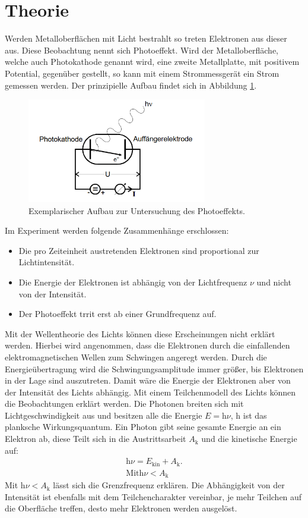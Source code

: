 \section{Theorie}
\label{sec:Theorie}
Werden Metalloberflächen mit Licht bestrahlt so treten Elektronen aus dieser aus.
Diese Beobachtung nennt sich Photoeffekt. Wird der Metalloberfläche, welche auch Photokathode genannt wird,
eine zweite Metallplatte, mit positivem Potential, gegenüber gestellt, so kann mit einem Strommessgerät ein
Strom gemessen werden. Der prinzipielle Aufbau findet sich in Abbildung \ref{fig:aufbau}.
\begin{figure}
 \centering
 \includegraphics[width=0.7\textwidth]{aufbau.png}
 \caption{Exemplarischer Aufbau zur Untersuchung des Photoeffekts.\cite{sample}}
 \label{fig:aufbau}
\end{figure}
Im Experiment werden folgende Zusammenhänge erschlossen:
\begin{itemize}
  \item Die pro Zeiteinheit austretenden Elektronen sind proportional zur Lichtintensität.
  \item Die Energie der Elektronen ist abhängig von der Lichtfrequenz $\nu$ und nicht von der Intensität.
  \item Der Photoeffekt trrit erst ab einer Grundfrequenz auf.
\end{itemize}
Mit der Wellentheorie des Lichts können diese Erscheinungen nicht erklärt werden.
Hierbei wird angenommen, dass die Elektronen durch die einfallenden elektromagnetischen Wellen zum Schwingen angeregt werden.
Durch die Energieübertragung wird die Schwingungsamplitude immer größer, bis Elektronen in der Lage sind auszutreten.
Damit wäre die Energie der Elektronen aber von der Intensität des Lichts abhängig.
Mit einem Teilchenmodell des Lichts können die Beobachtungen erklärt werden.
Die Photonen breiten sich mit Lichtgeschwindigkeit aus und besitzen alle die Energie $E=\mathrm{h}\nu$, $\mathrm{h}$ ist das planksche
Wirkungsquantum. Ein Photon gibt seine gesamte Energie an ein Elektron ab, diese Teilt sich in die Austrittsarbeit $A_\mathrm{k}$ und
die kinetische Energie auf:
\begin{align*}
\mathrm{h}\nu=E_\mathrm{kin} + A_\mathrm{k}.\\
\text{Mit} \mathrm{h}\nu < A_\mathrm{k}
\end{align*}
Mit $\mathrm{h}\nu < A_\mathrm{k}$ lässt sich die Grenzfrequenz erklären.
Die Abhängigkeit von der Intensität ist ebenfalls mit dem Teilchencharakter vereinbar, je mehr Teilchen auf die Oberfläche treffen,
desto mehr Elektronen werden ausgelöst.
